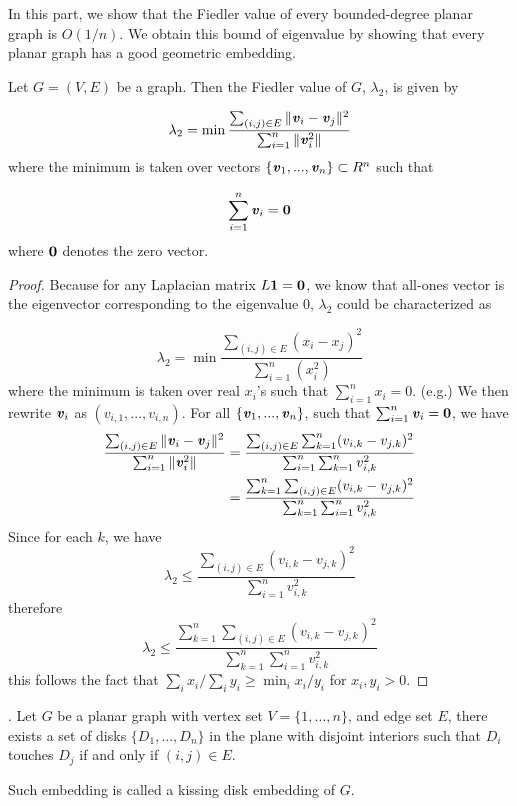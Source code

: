 In this part, we show that the Fiedler value of every bounded-degree planar graph is $O(1/n)$. We obtain this bound of eigenvalue by showing that every planar graph has a  good geometric embedding.  

\begin{lemma}\label{embedding_lemma} Let $G=(V,E)$ be a graph. Then the Fiedler value of $G$, $\lambda_2$, is given by 

$$
\lambda_2 = \min \frac{\sum_{(i,j)\in E}\|\boldsymbol{\mathit{v}}_i-\boldsymbol{\mathit{v}}_j\|^2}{\sum_{i=1}^n\|\boldsymbol{\mathit{v}}_i^2\|}
$$
where the minimum is taken over vectors $\{\boldsymbol{\mathit{v}}_1,...,\boldsymbol{\mathit{v}}_n\}\subset R^n$ such that 

$$
\sum_{i=1}^{n}\boldsymbol{\mathit{v}}_i=\boldsymbol{\mathbf{0}}
$$
where $\boldsymbol{\mathbf{0}}$ denotes the zero vector.

\end{lemma}
\begin{proof}
    Because for any Laplacian matrix $L\boldsymbol{\mathbf{1}}=\boldsymbol{\mathbf{0}}$, we know that all-ones vector is the eigenvector corresponding to the eigenvalue 0, $\lambda_2$ could be characterized as 

$$
\lambda_2 = \min \frac{\sum_{(i,j)\in E}(x_i-x_j)^2}{\sum_{i=1}^n(x_i^2)}
$$
where the minimum is taken over real $x_i$'s such that $\sum_{i=1}^{n}x_i=0$. 
(e.g.)
We then rewrite $\boldsymbol{\mathit{v}}_i$ as $(v_{i,1}, ..., v_{i,n})$. For all $\{\boldsymbol{\mathit{v}}_1, ..., \boldsymbol{\mathit{v}}_n\}$, such that $\sum_{i=1}^{n}\boldsymbol{\mathit{v}}_i=\boldsymbol{\mathbf{0}}$, we have
\begin{align*}
\frac{\sum_{(i,j)\in E}\|\boldsymbol{\mathit{v}}_i-\boldsymbol{\mathit{v}}_j\|^2}{\sum_{i=1}^n\|\boldsymbol{\mathit{v}}_i^2\|} 
& = \frac{\sum_{(i,j)\in E}\sum_{k=1}^{n}(v_{i,k}-v_{j,k})^2}{\sum_{i=1}^n\sum_{k=1}^{n}v_{i,k}^2} \\
& = \frac{\sum_{k=1}^{n}\sum_{(i,j)\in E}(v_{i,k}-v_{j,k})^2}{\sum_{k=1}^{n}\sum_{i=1}^nv_{i,k}^2} \\
\end{align*}
Since for each $k$, we have 
$$
\lambda_2 \leq \frac{\sum_{(i,j)\in E}(v_{i,k}-v_{j,k})^2}{\sum_{i=1}^nv_{i,k}^2} 
$$
therefore
$$
\lambda_2 \leq \frac{\sum_{k=1}^{n}\sum_{(i,j)\in E}(v_{i,k}-v_{j,k})^2}{\sum_{k=1}^{n}\sum_{i=1}^nv_{i,k}^2} 
$$
this follows the fact that $\sum_i x_i / \sum_i y_i \geq \min_i x_i / y_i$ for $x_i, y_i > 0$.

\end{proof}


\begin{theorem}\label{Koebe-Andreev-Thurston}. Let $G$ be a planar graph with vertex set $V=\{1,...,n\}$, and edge set $E$, there exists a set of disks $\{D_1, ...,D_n\}$ in the plane with disjoint interiors such that $D_i$ touches $D_j$ if and only if $(i,j)\in E$.
\end{theorem}
Such embedding is called a kissing disk embedding of $G$.

